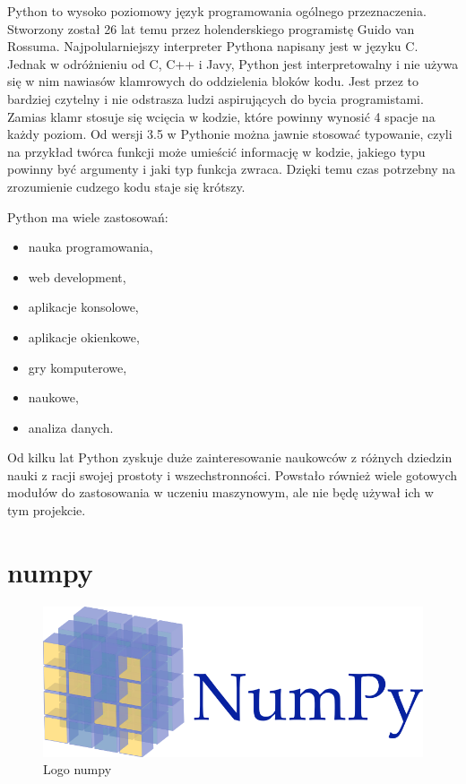 \documentclass{report}
\begin{document}
    Python to wysoko poziomowy język programowania ogólnego przeznaczenia.
    Stworzony został 26 lat temu przez holenderskiego programistę Guido van Rossuma.
    Najpolularniejszy interpreter Pythona napisany jest w języku C.
    Jednak w odróżnieniu od C, C++ i Javy, Python jest interpretowalny i nie używa się w nim nawiasów klamrowych do oddzielenia bloków kodu.
    Jest przez to bardziej czytelny i nie odstrasza ludzi aspirujących do bycia programistami.
    Zamias klamr stosuje się wcięcia w kodzie, które powinny wynosić 4 spacje na każdy poziom.
    Od wersji 3.5 w Pythonie można jawnie stosować typowanie, czyli na przykład twórca funkcji może umieścić informację w kodzie, jakiego typu powinny być argumenty i jaki typ funkcja zwraca.
    Dzięki temu czas potrzebny na zrozumienie cudzego kodu staje się krótszy.

    Python ma wiele zastosowań:

    \begin{itemize}
        \item nauka programowania,
        \item web development,
        \item aplikacje konsolowe,
        \item aplikacje okienkowe,
        \item gry komputerowe,
        \item naukowe,
        \item analiza danych.
    \end{itemize}

    Od kilku lat Python zyskuje duże zainteresowanie naukowców z różnych dziedzin nauki z racji swojej prostoty i wszechstronności.
    Powstało również wiele gotowych modułów do zastosowania w uczeniu maszynowym, ale nie będę używał ich w tym projekcie.

    \section{numpy}

    \begin{figure}
        \centering
        \includegraphics[scale=0.4]{./img/numpy-logo.png}
        \caption{Logo numpy}
    \end{figure}
\end{document}
